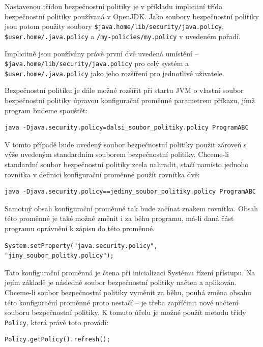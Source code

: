 Nastavenou třídou bezpečnostní politiky je v příkladu implicitní třída bezpečnostní politiky používaná v OpenJDK. Jako soubory bezpečnostní politiky jsou potom použity soubory {\tt \${java.home}/lib/security/java.policy}, {\tt \${user.home}/.java.policy} a {\tt /my-policies/my.policy} v uvedeném pořadí.

Implicitně jsou používány právě první dvě uvedená umístění -- {\tt \${java.home}/lib/security/java.policy} pro celý systém a {\tt \${user.home}/.java.policy} jako jeho rozšíření pro jednotlivé uživatele. \cite{refSecurity}

Bezpečnostní politiku je dále možné rozšířit při startu JVM o vlastní soubor bezpečnostní politiky úpravou konfigurační proměnné parametrem příkazu, jímž program budeme spouštět: \cite[5.3.1]{oaks}

\begin{verbatim}
java -Djava.security.policy=dalsi_soubor_politiky.policy ProgramABC
\end{verbatim}

V tomto případě bude uvedený soubor bezpečnostní politiky použit zároveň s výše uvedeným standardním souborem bezpečnostní politiky. Chceme-li standardní soubor bezpečnostní politiky zcela nahradit, stačí namísto jednoho rovnítka v definici konfigurační proměnné použít rovnítka dvě: \cite[5.3.1]{oaks}

\begin{verbatim}
java -Djava.security.policy==jediny_soubor_politiky.policy ProgramABC
\end{verbatim}

Samotný obsah konfigurační proměnné tak bude začínat znakem rovnítka. Obsah této proměnné je také možné změnit i za běhu programu, má-li daná část programu oprávnění k zápisu do této proměnné.

\begin{verbatim}
System.setProperty("java.security.policy", "jiny_soubor_politky.policy");
\end{verbatim}

Tato konfigurační proměnná je čtena při inicializaci Systému řízení přístupu. Na jejím základě je následně soubor bezpečnostní politiky načten a aplikován. Chceme-li soubor bezpečnostní politiky vyměnit za běhu, pouhá změna obsahu této konfigurační proměnné proto nestačí -- je třeba zapříčinit nové načtení souboru bezpečnostní politiky. K tomuto účelu je možné použít metodu třídy {\tt Policy}, která právě toto provádí:

\begin{verbatim}
Policy.getPolicy().refresh();
\end{verbatim}


